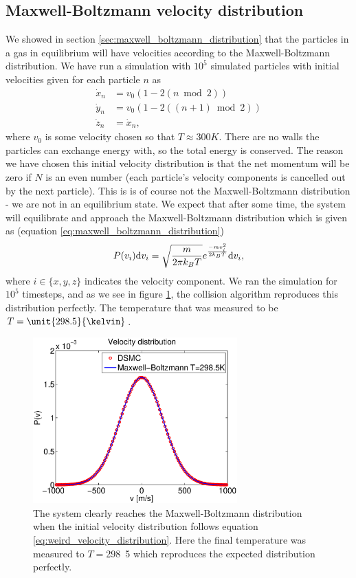 \subsection{Maxwell-Boltzmann velocity distribution}
We showed in section \ref{sec:maxwell_boltzmann_distribution} that the particles in a gas in equilibrium will have velocities according to the Maxwell-Boltzmann distribution. We have run a simulation with $10^5$ simulated particles with initial velocities given for each particle $n$ as
\begin{align}
	\nonumber
	\dot x_n &= v_0(1 - 2 (n\bmod 2))\\
	\label{eq:weird_velocity_distribution}
	\dot y_n &= v_0(1 - 2 ((n+1)\bmod 2))\\
	\nonumber
	\dot z_n &= \dot x_n,
\end{align}
where $v_0$ is some velocity chosen so that $T\approx 300K$. There are no walls the particles can exchange energy with, so the total energy is conserved. The reason we have chosen this initial velocity distribution is that the net momentum will be zero if $N$ is an even number (each particle's velocity components is cancelled out by the next particle). This is is of course not the Maxwell-Boltzmann distribution - we are not in an equilibrium state. We expect that after some time, the system will equilibrate and approach the Maxwell-Boltzmann distribution which is given as (equation \eqref{eq:maxwell_boltzmann_distribution})
\begin{align}
	P(v_i)\mathrm{d}v_i = \sqrt{m\over 2\pi k_BT}e^{-mv_i^2\over 2k_BT}\mathrm{d}v_i,
\end{align}
where $i\in \{x,y,z\}$ indicates the velocity component. We ran the simulation for $10^5$ timesteps, and as we see in figure \ref{fig:velocity_distribution}, the collision algorithm reproduces this distribution perfectly. The temperature that was measured to be $T=\unit{298.5}{\kelvin}$.
\begin{figure}[htpb]
\begin{center}
\includegraphics[width=0.7\textwidth, trim=0cm 0cm 0cm 0cm, clip]{DSMC/figures/velocity_distribution.eps}
\end{center}
\caption{The system clearly reaches the Maxwell-Boltzmann distribution when the initial velocity distribution follows equation \ref{eq:weird_velocity_distribution}. Here the final temperature was measured to $T=$\unit{298.5}{\kelvin} which reproduces the expected distribution perfectly.}
\label{fig:velocity_distribution}
\end{figure}

